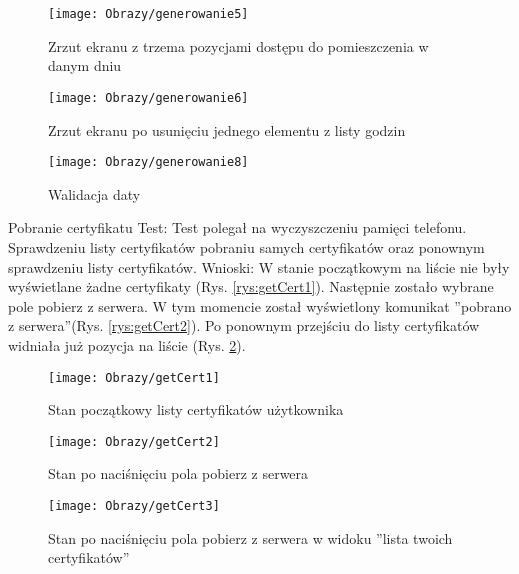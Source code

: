 \begin{enumerate*}
	\begin{figure}
		\centering
		\begin{minipage}{0.2\textwidth}
			\vspace{0.4cm}
			\texttt{[image: Obrazy/generowanie5]}
			\caption{Zrzut ekranu z trzema pozycjami dostępu do pomieszczenia w danym dniu }
			\label{rys:generowanie5}
		\end{minipage}
	\hspace{0.05\textwidth}
		\begin{minipage}{0.2\textwidth}
			\texttt{[image: Obrazy/generowanie6]}
			\caption{Zrzut ekranu po usunięciu jednego elementu z listy godzin}
			\label{rys:generowanie6}
		\end{minipage}
	\hspace{0.05\textwidth}
		\begin{minipage}{0.2\textwidth}
			\vspace{-0.5cm}
			\texttt{[image: Obrazy/generowanie8]}
			\caption{Walidacja daty}
			\label{rys:generowanie7}
		\end{minipage}
	\end{figure}
	
	\newpage
	\item  Pobranie certyfikatu\newline
	Test: Test polegał na wyczyszczeniu pamięci telefonu. Sprawdzeniu listy certyfikatów pobraniu samych certyfikatów oraz ponownym sprawdzeniu listy certyfikatów.\newline
	Wnioski: W stanie początkowym na liście nie były wyświetlane żadne certyfikaty (Rys. \ref{rys:getCert1}). Następnie zostało wybrane pole pobierz z serwera. W tym momencie został wyświetlony komunikat ''pobrano z serwera''(Rys. \ref{rys:getCert2}). Po ponownym przejściu do listy certyfikatów widniała już pozycja na liście (Rys. \ref{rys:getCert3}).
	\begin{figure}[ht!]
		\centering
		\begin{minipage}{0.2\textwidth}
			\texttt{[image: Obrazy/getCert1]}
			\caption{Stan początkowy listy certyfikatów użytkownika }
			\label{rys:getCert1}
		\end{minipage}
	\hspace{0.05\textwidth}
		\begin{minipage}{0.2\textwidth}
			\texttt{[image: Obrazy/getCert2]}
			\caption{Stan po naciśnięciu pola pobierz z serwera }
			\label{rys:getCert2}
		\end{minipage}
	\hspace{0.05\textwidth}
		\begin{minipage}{0.3\textwidth}
			\texttt{[image: Obrazy/getCert3]}
			\caption{Stan po naciśnięciu pola pobierz z serwera w widoku ''lista twoich certyfikatów''}
			\label{rys:getCert3}
		\end{minipage}
	\end{figure}


\end{enumerate*}
